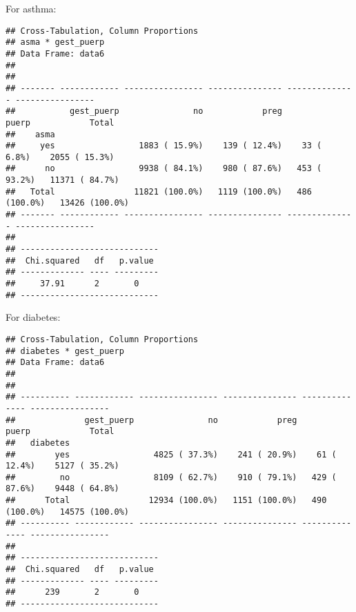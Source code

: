 \documentclass[
]{article}
\newenvironment{Shaded}{\begin{snugshade}}{\end{snugshade}}
\newcommand{\DataTypeTok}[1]{\textcolor[rgb]{0.13,0.29,0.53}{#1}}
\newcommand{\KeywordTok}[1]{\textcolor[rgb]{0.13,0.29,0.53}{\textbf{#1}}}
\newcommand{\NormalTok}[1]{#1}
\newcommand{\OperatorTok}[1]{\textcolor[rgb]{0.81,0.36,0.00}{\textbf{#1}}}
\newcommand{\OtherTok}[1]{\textcolor[rgb]{0.56,0.35,0.01}{#1}}
\newcommand{\StringTok}[1]{\textcolor[rgb]{0.31,0.60,0.02}{#1}}
\begin{document}
For asthma:

\begin{Shaded}
\end{Shaded}

\begin{verbatim}
## Cross-Tabulation, Column Proportions  
## asma * gest_puerp  
## Data Frame: data6  
## 
## 
## ------- ------------ ---------------- --------------- -------------- ----------------
##           gest_puerp               no            preg          puerp            Total
##    asma                                                                              
##     yes                 1883 ( 15.9%)    139 ( 12.4%)    33 (  6.8%)    2055 ( 15.3%)
##      no                 9938 ( 84.1%)    980 ( 87.6%)   453 ( 93.2%)   11371 ( 84.7%)
##   Total                11821 (100.0%)   1119 (100.0%)   486 (100.0%)   13426 (100.0%)
## ------- ------------ ---------------- --------------- -------------- ----------------
## 
## ----------------------------
##  Chi.squared   df   p.value 
## ------------- ---- ---------
##     37.91      2       0    
## ----------------------------
\end{verbatim}

For diabetes:

\begin{Shaded}
\end{Shaded}

\begin{verbatim}
## Cross-Tabulation, Column Proportions  
## diabetes * gest_puerp  
## Data Frame: data6  
## 
## 
## ---------- ------------ ---------------- --------------- -------------- ----------------
##              gest_puerp               no            preg          puerp            Total
##   diabetes                                                                              
##        yes                 4825 ( 37.3%)    241 ( 20.9%)    61 ( 12.4%)    5127 ( 35.2%)
##         no                 8109 ( 62.7%)    910 ( 79.1%)   429 ( 87.6%)    9448 ( 64.8%)
##      Total                12934 (100.0%)   1151 (100.0%)   490 (100.0%)   14575 (100.0%)
## ---------- ------------ ---------------- --------------- -------------- ----------------
## 
## ----------------------------
##  Chi.squared   df   p.value 
## ------------- ---- ---------
##      239       2       0    
## ----------------------------
\end{verbatim}
\end{document}
